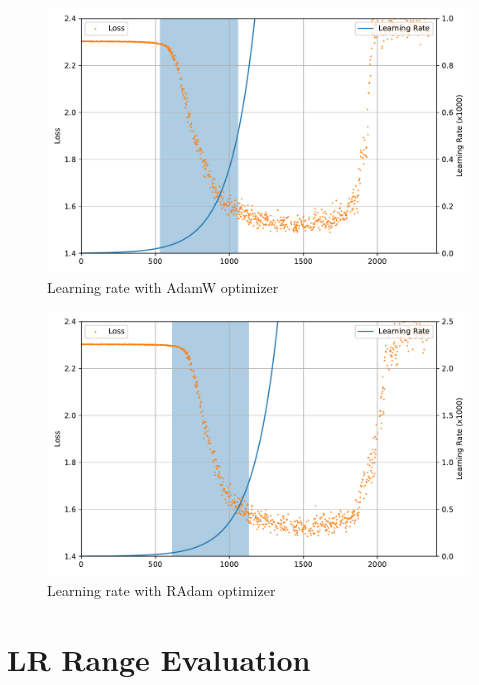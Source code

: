 \documentclass{article}
\begin{document}
\begin{figure}[ht!]
    \centering
    \includegraphics[scale=0.64]{images/lr_range_adamw.pdf}
    \caption{Learning rate with AdamW optimizer}\label{fig:lr_range_adamw}
\end{figure}

\begin{figure}[ht!]
    \centering
    \includegraphics[scale=0.64]{images/lr_range_radam.pdf}
    \caption{Learning rate with RAdam optimizer}\label{fig:lr_range_radam}
\end{figure}

\section{LR Range Evaluation}
\end{document}

